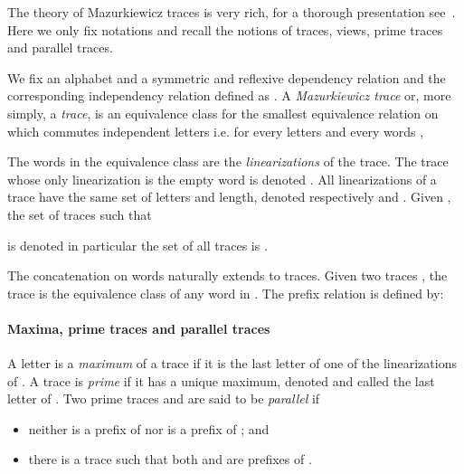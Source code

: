 \documentclass[a4paper,UKenglish]{lipics-v2016}
\begin{document}
The theory of Mazurkiewicz traces is very rich,
for a thorough presentation see~\cite{thebook}.
Here we only fix notations and recall the notions of traces, views, prime traces and parallel traces.


We fix an alphabet  and a symmetric and reflexive dependency relation 
and the corresponding independency relation  defined as .
A  \emph{Mazurkiewicz trace}
or, more simply, a \emph{trace},
is an equivalence class
for the smallest equivalence relation  on  
which commutes independent letters i.e.
for every letters 
and every words ,

The words in the equivalence class are the \emph{linearizations} of the trace.
The trace whose only linearization is the empty word is 
denoted .
All linearizations of a trace  have the same set of letters and length, denoted respectively  and .
Given ,
the set of traces such that

is denoted 
in particular the set of all traces is 
.

The concatenation on words naturally extends to traces.
Given two traces , the trace  is the equivalence class of any word in .
The prefix relation  is defined by:



\paragraph*{Maxima, prime traces and parallel traces}
A letter  is a \emph{maximum} of a trace  if it is the last letter of one of the linearizations of  .
A trace  is \emph{prime} if it has a unique maximum,
denoted 
and called the last letter of .
Two prime traces  and  are said to be \emph{parallel}
if 
\begin{itemize}
\item
neither 
 is a prefix of  nor 
 is a prefix of ; and
\item
there is a trace  such that both  and  are prefixes of .
\end{itemize}
\end{document}
